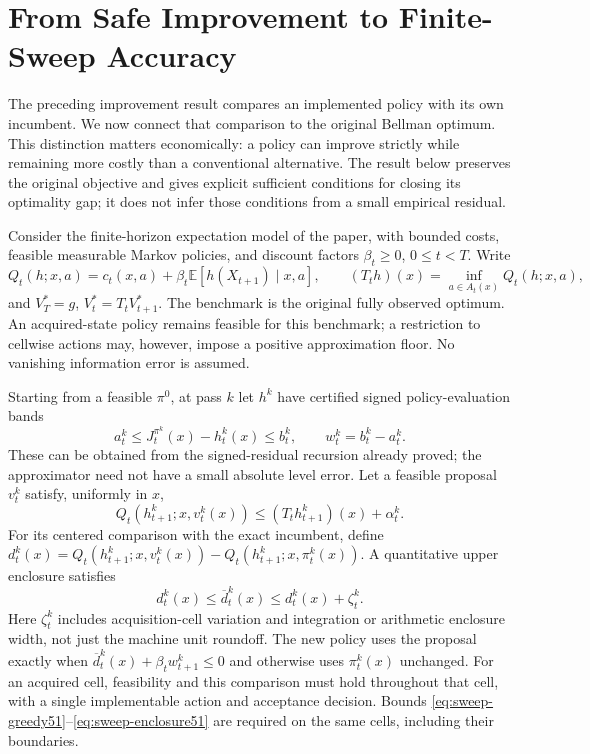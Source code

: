 \section{From Safe Improvement to Finite-Sweep Accuracy}\label{sec:finite-sweeps51}
The preceding improvement result compares an implemented policy with its own
incumbent. We now connect that comparison to the original Bellman optimum.
This distinction matters economically: a policy can improve strictly while
remaining more costly than a conventional alternative. The result below
preserves the original objective and gives explicit sufficient conditions for
closing its optimality gap; it does not infer those conditions from a small
empirical residual.

Consider the finite-horizon expectation model of the paper, with bounded
costs, feasible measurable Markov policies, and discount factors
$\beta_t\geq0$, $0\leq t<T$. Write
\[
 Q_t(h;x,a)=c_t(x,a)+\beta_t\mathbb E[h(X_{t+1})\mid x,a],\qquad
 (T_th)(x)=\inf_{a\in A_t(x)}Q_t(h;x,a),
\]
and $V_T^*=g$, $V_t^*=T_tV_{t+1}^*$. The benchmark is the original
fully observed optimum. An acquired-state policy remains feasible for this
benchmark; a restriction to cellwise actions may, however, impose a positive
approximation floor. No vanishing information error is assumed.

Starting from a feasible $\pi^0$, at pass $k$ let $h^k$ have certified
signed policy-evaluation bands
\begin{equation}\label{eq:sweep-bands51}
 a_t^k\leq J_t^{\pi^k}(x)-h_t^k(x)\leq b_t^k,
 \qquad w_t^k=b_t^k-a_t^k.
\end{equation}
These can be obtained from the signed-residual recursion already proved;
the approximator need not have a small absolute level error. Let a feasible
proposal $v_t^k$ satisfy, uniformly in $x$,
\begin{equation}\label{eq:sweep-greedy51}
 Q_t(h_{t+1}^k;x,v_t^k(x))\leq (T_th_{t+1}^k)(x)+\alpha_t^k.
\end{equation}
For its centered comparison with the exact incumbent, define
$d_t^k(x)=Q_t(h_{t+1}^k;x,v_t^k(x))-
Q_t(h_{t+1}^k;x,\pi_t^k(x))$.
A quantitative upper enclosure satisfies
\begin{equation}\label{eq:sweep-enclosure51}
 d_t^k(x)\leq\overline d_t^k(x)\leq d_t^k(x)+\zeta_t^k.
\end{equation}
Here $\zeta_t^k$ includes acquisition-cell variation and integration or
arithmetic enclosure width, not just the machine unit roundoff. The new
policy uses the proposal exactly when
$\overline d_t^k(x)+\beta_tw_{t+1}^k\leq0$ and otherwise uses
$\pi_t^k(x)$ unchanged. For an acquired cell, feasibility and this comparison
must hold throughout that cell, with a single implementable action and
acceptance decision. Bounds \eqref{eq:sweep-greedy51}--\eqref{eq:sweep-enclosure51}
are required on the same cells, including their boundaries.

